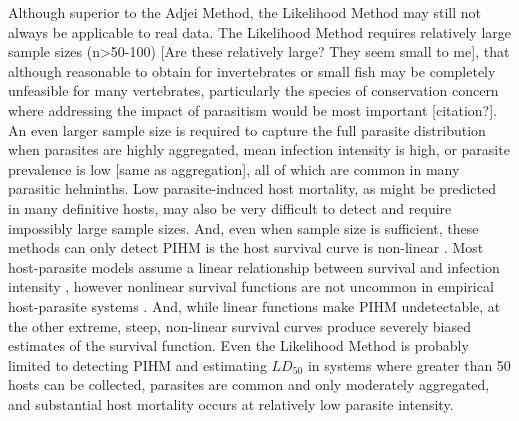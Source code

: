 \documentclass[12pt, a4paper]{article}
\begin{document}
Although superior to the Adjei Method, the Likelihood Method may still not always be
applicable to real data.  The Likelihood Method requires relatively large
sample sizes (n>50-100) [Are these relatively large? They seem small to me], that although reasonable
to obtain for invertebrates or small fish may be completely unfeasible for many
vertebrates, particularly the species of conservation concern where addressing
the impact of parasitism would be most important [citation?]. An even larger sample size is
required to capture the full parasite distribution when parasites are highly
aggregated, mean infection intensity is high, or parasite prevalence is low [same as aggregation],
all of which are common in many parasitic helminths.  Low parasite-induced host
mortality, as might be predicted in many definitive hosts, may also be very
difficult to detect and require impossibly large sample sizes. And, even
when sample size is sufficient, these methods can only detect PIHM is the host
survival curve is non-linear \citep{Lanciani1989}. Most host-parasite models assume a linear
relationship between survival and infection intensity \citep{AndersonandMay1978,McCallum2000a}, however
nonlinear survival functions are not uncommon in empirical host-parasite
systems \citep{Benesh2011}.  And, while linear functions make PIHM undetectable, at the other extreme, steep, non-linear survival curves produce severely biased estimates of the survival function. Even the Likelihood Method is probably limited to
detecting PIHM and estimating $LD_{50}$ in systems where greater than 50 hosts can be
collected, parasites are common and only moderately aggregated, and
substantial host mortality occurs at relatively low parasite intensity.
\end{document}

